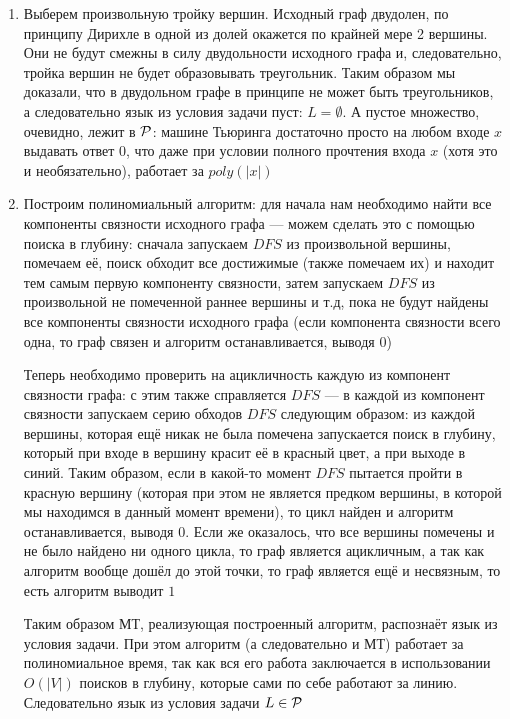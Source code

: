 \documentclass[a4paper,12pt]{article}
\begin{document}
\begin{solution}

	\begin{enumerate}
		\item Выберем произвольную тройку вершин. Исходный граф двудолен, по принципу Дирихле в одной из долей окажется по крайней мере 2 вершины. Они не будут смежны в силу двудольности исходного графа и, следовательно, тройка вершин не будет образовывать треугольник. Таким образом мы доказали, что в двудольном графе в принципе не может быть треугольников, а следовательно язык из условия задачи пуст: $L = \emptyset$. А пустое множество, очевидно, лежит в $\P$: машине Тьюринга достаточно просто на любом входе $x$ выдавать ответ $0$, что даже при условии полного прочтения входа $x$ (хотя это и необязательно), работает за $poly(|x|)$
		
		\item Построим полиномиальный алгоритм: для начала нам необходимо найти все компоненты связности исходного графа --- можем сделать это с помощью поиска в глубину: сначала запускаем $DFS$ из произвольной вершины, помечаем её, поиск обходит все достижимые (также помечаем их) и находит тем самым первую компоненту связности, затем запускаем $DFS$ из произвольной не помеченной раннее вершины и т.д, пока не будут найдены все компоненты связности исходного графа (если компонента связности всего одна, то граф связен и алгоритм останавливается, выводя $0$)
		
		Теперь необходимо проверить на ацикличность каждую из компонент связности графа: с этим также справляется $DFS$ --- в каждой из компонент связности запускаем серию обходов $DFS$ следующим образом: из каждой вершины, которая ещё никак не была помечена запускается поиск в глубину, который при входе в вершину красит её в красный цвет, а при выходе в синий. Таким образом, если в какой-то момент $DFS$ пытается пройти в красную вершину (которая при этом не является предком вершины, в которой мы находимся в данный момент времени), то цикл найден и алгоритм останавливается, выводя $0$. Если же оказалось, что все вершины помечены и не было найдено ни одного цикла, то граф является ацикличным, а так как алгоритм вообще дошёл до этой точки, то граф является ещё и несвязным, то есть алгоритм выводит $1$
		
		Таким образом МТ, реализующая построенный алгоритм, распознаёт язык из условия задачи. При этом алгоритм (а следовательно и МТ) работает за полиномиальное время, так как вся его работа заключается в использовании $O\left(|V|\right)$ поисков в глубину, которые сами по себе работают за линию. Следовательно язык из условия задачи $L \in \P$
		

\end{enumerate}
\end{solution}
\end{document}
